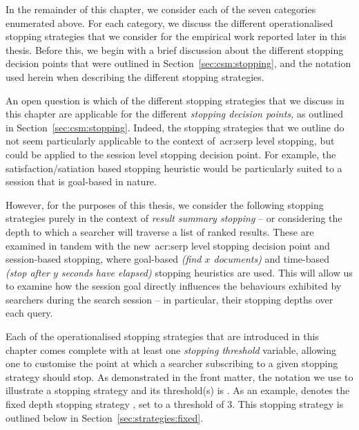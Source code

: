 In the remainder of this chapter, we consider each of the seven categories enumerated above. For each category, we discuss the different operationalised stopping strategies that we consider for the empirical work reported later in this thesis. Before this, we begin with a brief discussion about the different stopping decision points that were outlined in Section~\ref{sec:csm:stopping}, and the notation used herein when describing the different stopping strategies.

An open question is which of the different stopping strategies that we discuss in this chapter are applicable for the different \emph{stopping decision points,} as outlined in Section~\ref{sec:csm:stopping}. Indeed, the stopping strategies that we outline do not seem particularly applicable to the context of~\gls{acr:serp} level stopping, but could be applied to the session level stopping decision point. For example, the satisfaction/satiation based stopping heuristic would be particularly suited to a session that is goal-based in nature.

However, for the purposes of this thesis, we consider the following stopping strategies purely in the context of \emph{result summary stopping} -- or considering the depth to which a searcher will traverse a list of ranked results. These are examined in tandem with the new~\gls{acr:serp} level stopping decision point and session-based stopping, where goal-based \emph{(find $x$ documents)} and time-based \emph{(stop after $y$ seconds have elapsed)} stopping heuristics are used. This will allow us to examine how the session goal directly influences the behaviours exhibited by searchers during the search session -- in particular, their stopping depths over each query.

Each of the operationalised stopping strategies that are introduced in this chapter comes complete with at least one \emph{stopping threshold} variable, allowing one to customise the point at which a searcher subscribing to a given stopping strategy should stop. As demonstrated in the  front matter, the notation we use to illustrate a stopping strategy and its threshold(s) is . As an example,  denotes the fixed depth stopping strategy , set to a threshold of $3$. This stopping strategy is outlined below in Section~\ref{sec:strategies:fixed}.

